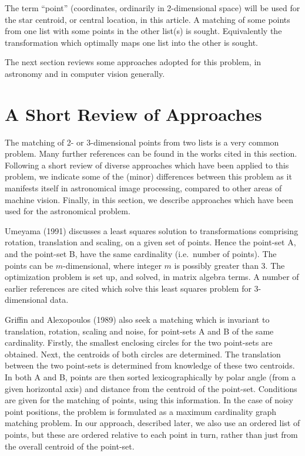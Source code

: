 The term ``point'' (coordinates, ordinarily in 2-dimensional space) 
will be used for the 
star centroid, or central location, in this article.
A matching of some points from one list with some points in the 
other list(s) is sought.  Equivalently the transformation which optimally 
maps one list into the other is sought.  

The next section reviews some approaches adopted for this problem, in 
astronomy and in computer vision generally.

\section{A Short Review of Approaches}

The matching of 2- or 3-dimensional points from two lists is a very common
problem.  Many further references can be found in
the works cited in this section. Following a short review of 
diverse approaches which 
have been applied to this problem, we indicate some of the (minor)
differences between this problem as it manifests itself in astronomical
image processing, compared to other areas of machine vision.  Finally,
in this section, we describe approaches which have been used for the
astronomical problem.

Umeyama (1991) discusses a least squares solution to transformations
comprising rotation, translation and scaling, on a given set of points.
Hence the point-set A, and the point-set B, have the same cardinality
(i.e.\ number of points).
The points can be $m$-dimensional, where integer $m$ is possibly greater 
than 3.  The optimization problem is set up,
and solved, in matrix algebra terms.  A number of earlier references 
are cited which solve this least squares problem for 3-dimensional data.

Griffin and Alexopoulos (1989) also seek a matching which is invariant
to translation, rotation, scaling and noise, for point-sets A and B of the
same cardinality.  Firstly, the smallest enclosing
circles for the two point-sets are obtained.  Next, the centroids of both
circles are determined.  The translation between the two point-sets is
determined from knowledge of these two centroids.  In both A and B,
points are then sorted lexicographically by polar angle (from a given 
horizontal axis) and distance from the centroid of the point-set.  
Conditions are given
for the matching of points, using this information.  In the case of noisy
point positions, the problem is formulated as a maximum cardinality graph
matching problem.  In our approach, described later, we also use an 
ordered list of points, but these are ordered relative to each point in
turn, rather than just from the overall centroid of the point-set.

